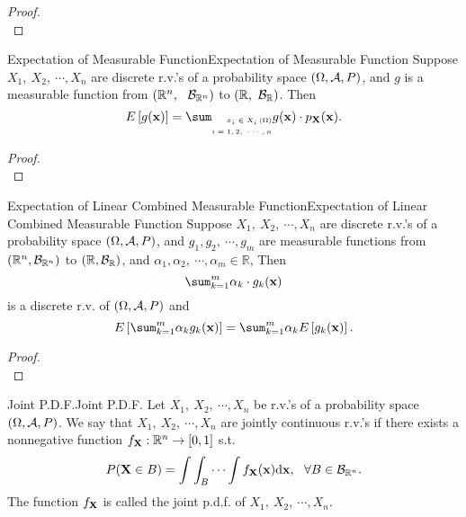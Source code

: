 \documentclass{elegantbook}
\begin{document}
\begin{proof}
\\[4cm]\vspace{0.01cm}
\end{proof}

\begin{theorem}{Expectation of Measurable Function}{Expectation of Measurable Function}
Suppose $X_1,\ X_2,\ \cdots,X_n$ are discrete r.v.'s of a probability space $(\Omega,\mathcal{A}, P)$, and $g$ is a measurable function from $(\mathbb{R}^n,\ \ \mb_{\mathbb{R}^n})$ to $(\mathbb{R},\ \mathcal{B}_\mathbb{R})$. Then
\[E\left\lbrack g(\mx) \right\rbrack = \sum_{\mbox{\tiny$\begin{aligned}
x_{i} \in X_{i}\left( \Omega \right) \\
i = 1,2,\ \cdots,n \\
\end{aligned}$}}^{}{g(\mx) \cdot p_{\mX}(\mx).}\]
\end{theorem}

\begin{proof}
\\[4cm]\vspace{0.01cm}
\end{proof}

\begin{corollary}{Expectation of Linear Combined Measurable Function}{Expectation of Linear Combined Measurable Function}
Suppose $X_1,\ X_2,\ \cdots,X_n$ are discrete r.v.'s of a probability space $(\Omega,\mathcal{A}, P)$, and $g_1,g_2,\ \cdots,g_m$ are measurable functions from $(\mathbb{R}^n,\mathcal{B}_{\mathbb{R}^n})$ to $(\mathbb{R},\mathcal{B}_\mathbb{R})$, and $\alpha_1,\alpha_2,\ \cdots,\alpha_m\in\mathbb{R}$,
Then $$\sum_{k=1}^{m}\alpha_k\cdot g_k(\mx)$$ is a discrete r.v. of $(\Omega,\mathcal{A}, P)$ and 
\[E\left\lbrack \sum_{k = 1}^{m}\alpha_{k}g_{k}(\mx) \right\rbrack = \sum_{k = 1}^{m}\alpha_{k}E\left\lbrack g_{k}(\mx) \right\rbrack.\]
\end{corollary}

\begin{proof}
\\[4cm]\vspace{0.01cm}
\end{proof}

\begin{definition}{Joint P.D.F.}{Joint P.D.F.}
Let $X_1,\ X_2,\ \cdots,X_n$ be r.v.'s of a probability space $(\Omega,\mathcal{A}, P)$. We say that $X_1,\ X_2,\ \cdots,X_n$ are jointly continuous r.v.'s if there exists a nonnegative function $f_{\mathbf{X}}:\mathbb{R}^n\rightarrow[0,1]$ s.t.
$$
P(\mX\in B)=\int\int_{B}\cdots\int f_{\mX}(\mx)\dif \mx,\ \ \forall B\in\mb_{\mathbb{R}^n}.
$$
The function $f_{\mathbf{X}}$ is called the joint p.d.f. of $X_1,\ X_2,\ \cdots,X_n$.
\end{definition}
\end{document}
